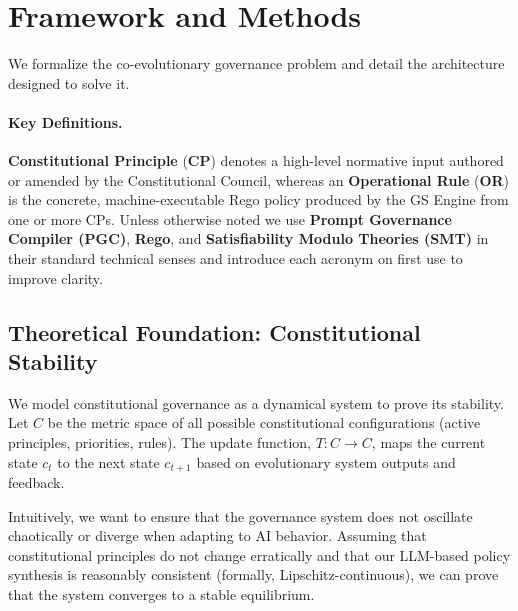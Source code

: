 \section{Framework and Methods}\label{sec:methods}
We formalize the co-evolutionary governance problem and detail the architecture designed to solve it. \paragraph{Key Definitions.} \textbf{Constitutional Principle} (\textbf{CP}) denotes a high-level normative input authored or amended by the Constitutional Council, whereas an \textbf{Operational Rule} (\textbf{OR}) is the concrete, machine-executable Rego policy produced by the GS Engine from one or more CPs. Unless otherwise noted we use \textbf{Prompt Governance Compiler (PGC)}, \textbf{Rego}, and \textbf{Satisfiability Modulo Theories (SMT)} in their standard technical senses and introduce each acronym on first use to improve clarity.

\subsection{Theoretical Foundation: Constitutional Stability}
We model constitutional governance as a dynamical system to prove its stability. Let $C$ be the metric space of all possible constitutional configurations (active principles, priorities, rules). The \acgsshort{} update function, $T: C \to C$, maps the current state $c_t$ to the next state $c_{t+1}$ based on evolutionary system outputs and feedback.

Intuitively, we want to ensure that the governance system does not oscillate chaotically or diverge when adapting to AI behavior. Assuming that constitutional principles do not change erratically and that our LLM-based policy synthesis is reasonably consistent (formally, Lipschitz-continuous), we can prove that the system converges to a stable equilibrium.

